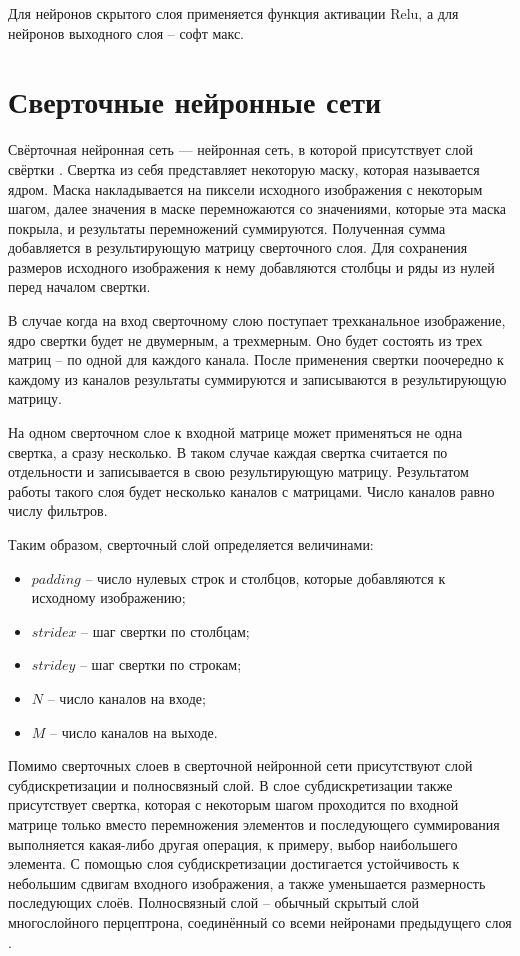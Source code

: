 Для нейронов скрытого слоя применяется функция активации Relu, а для нейронов выходного слоя -- софт макс.

\section{Сверточные нейронные сети}
Свёрточная нейронная сеть — нейронная сеть, в которой присутствует слой свёртки \cite{svertka}. Свертка из себя представляет некоторую маску, которая называется ядром. Маска накладывается на пиксели исходного изображения с некоторым шагом, далее значения в маске перемножаются со значениями, которые эта маска покрыла, и результаты перемножений суммируются. Полученная сумма добавляется в результирующую матрицу сверточного слоя. Для сохранения размеров исходного изображения к нему добавляются столбцы и ряды из нулей перед началом свертки.

В случае когда на вход сверточному слою поступает трехканальное изображение, ядро свертки будет не двумерным, а трехмерным. Оно будет состоять из трех матриц -- по одной для каждого канала. После применения свертки поочередно к каждому из каналов результаты суммируются и записываются в результирующую матрицу.

На одном сверточном слое к входной матрице может применяться не одна свертка, а сразу несколько. В таком случае каждая свертка считается по отдельности и записывается в свою результирующую матрицу. Результатом работы такого слоя будет несколько каналов с матрицами. Число каналов равно числу фильтров.

Таким образом, сверточный слой определяется величинами:
\begin{itemize}
	\item $padding$ -- число нулевых строк и столбцов, которые добавляются к исходному изображению;
	\item $stridex$ -- шаг свертки по столбцам;
	\item $stridey$ -- шаг свертки по строкам;
	\item $N$ -- число каналов на входе;
	\item $M$ -- число каналов на выходе.
\end{itemize}

Помимо сверточных слоев в сверточной нейронной сети присутствуют слой субдискретизации и полносвязный слой. В слое субдискретизации также присутствует свертка, которая с некоторым шагом проходится по входной матрице только вместо перемножения элементов и последующего суммирования выполняется какая-либо другая операция, к примеру, выбор наибольшего элемента. С помощью слоя субдискретизации достигается устойчивость к небольшим сдвигам входного изображения, а также
уменьшается размерность последующих слоёв. Полносвязный слой -- обычный скрытый слой многослойного перцептрона, соединённый со всеми нейронами предыдущего слоя \cite{svertka}.

